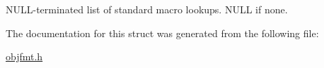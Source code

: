 N\-U\-L\-L-\/terminated list of standard macro lookups. N\-U\-L\-L if none. 

The documentation for this struct was generated from the following file\-:\begin{DoxyCompactItemize}
\item 
\hyperlink{objfmt_8h}{objfmt.\-h}\end{DoxyCompactItemize}
